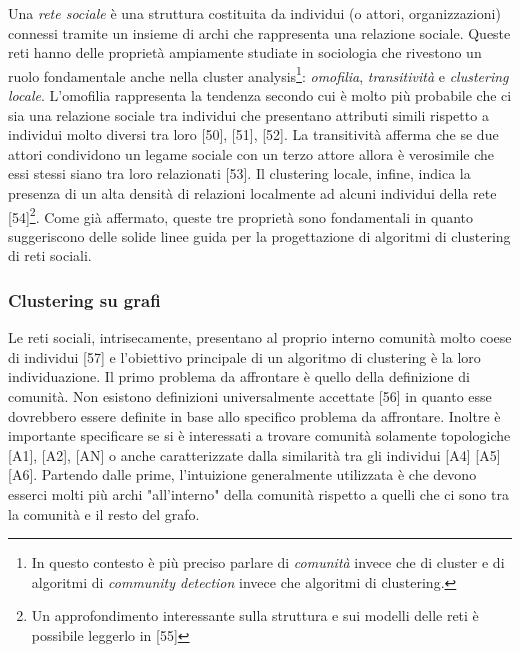 Una \textit{rete sociale} \`e una struttura costituita da individui (o attori, organizzazioni) connessi tramite un insieme di archi che rappresenta una relazione sociale. Queste reti hanno delle propriet\`a ampiamente studiate in sociologia che rivestono un ruolo fondamentale anche nella cluster analysis\footnote{In questo contesto \`e pi\`u preciso parlare di \textit{comunit\`a} invece che di cluster e di algoritmi di \textit{community detection} invece che algoritmi di clustering.}: \textit{omofilia}, \textit{transitivit\`a} e \textit{clustering locale}. L'omofilia rappresenta la tendenza secondo cui \`e molto pi\`u probabile che ci sia una relazione sociale tra individui che presentano attributi simili rispetto a individui molto diversi tra loro [50], [51], [52]. La transitivit\`a afferma che se due attori condividono un legame sociale con un terzo attore allora \`e verosimile che essi stessi siano tra loro relazionati [53]. Il clustering locale, infine, indica la presenza di un alta densit\`a di relazioni localmente ad alcuni individui della rete [54]\footnote{Un approfondimento interessante sulla struttura e sui modelli delle reti \`e possibile leggerlo in [55]}. Come gi\`a affermato, queste tre propriet\`a sono fondamentali in quanto suggeriscono delle solide linee guida per la progettazione di algoritmi di clustering di reti sociali. 

\subsubsection{Clustering su grafi}
Le reti sociali, intrisecamente, presentano al proprio interno comunit\`a molto coese di individui [57] e l'obiettivo principale di un algoritmo di clustering \`e la loro individuazione. Il primo problema da affrontare \`e quello della definizione di comunit\`a. Non esistono definizioni universalmente accettate [56] in quanto esse dovrebbero essere definite in base allo specifico problema da affrontare. Inoltre \`e importante specificare se si \`e interessati a trovare comunit\`a solamente topologiche [A1], [A2], [AN] o anche caratterizzate dalla similarit\`a tra gli individui [A4] [A5] [A6]. Partendo dalle prime, l'intuizione generalmente utilizzata \`e che devono esserci molti pi\`u archi "all'interno" della comunit\`a rispetto a quelli che ci sono tra la comunit\`a e il resto del grafo. 


